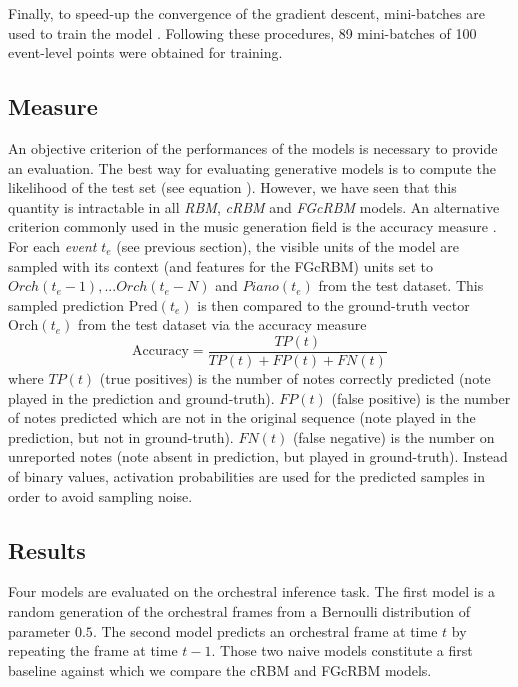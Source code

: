 \documentclass[letterpaper]{article}
\begin{document}
Finally, to speed-up the convergence of the gradient descent, mini-batches are used to train the model \cite{bishop2006pattern}. Following these procedures, 89 mini-batches of 100 event-level points were obtained for training.

\subsection{Measure}
An objective criterion of the performances of the models is necessary to provide an evaluation. 
The best way for evaluating generative models is to compute the likelihood of the test set (see equation ). However, we have seen that this quantity is intractable in all \textit{RBM}, \textit{cRBM} and \textit{FGcRBM} models. 
An alternative criterion commonly used in the music generation field is the accuracy measure \cite{DBLP:journals/corr/YaoCVDD15,boulanger2012modeling,lavrenko2003polyphonic}. For each \textit{event} $t_{e}$ (see previous section), the visible units of the model are sampled with its context (and features for the FGcRBM) units set to $Orch(t_{e}-1),... Orch(t_{e}-N)$ and $Piano(t_{e})$ from the test dataset. This sampled prediction $\text{Pred}(t_{e})$ is then compared to the ground-truth vector $\text{Orch}(t_{e})$ from the test dataset via the accuracy measure
\begin{equation}
\text{Accuracy}  = \frac{TP(t)}{TP(t) + FP(t) + FN(t)}
\label{eq:accuracy}
\end{equation}
where $TP(t)$ (true positives) is the number of notes correctly predicted (note played in the prediction and ground-truth). $FP(t)$ (false positive) is the number of notes predicted which are not in the original sequence (note played in the prediction, but not in ground-truth). $FN(t)$ (false negative) is the number on unreported notes (note absent in prediction, but played in ground-truth). 
Instead of binary values, activation probabilities are used for the predicted samples in order to avoid sampling noise.

\subsection{Results}
Four models are evaluated on the orchestral inference task. The first model is a random generation of the orchestral frames from a Bernoulli distribution of parameter $0.5$. The second model predicts an orchestral frame at time $t$ by repeating the frame at time $t-1$. Those two naive models constitute a first baseline against which we compare the cRBM and FGcRBM models.
\end{document}
